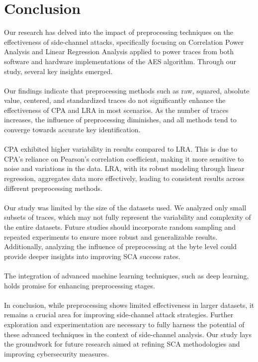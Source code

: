 \documentclass[a4paper,10pt]{article}
\begin{document}
\section{Conclusion}
Our research has delved into the impact of preprocessing techniques on the effectiveness of side-channel attacks, specifically focusing on Correlation Power Analysis and Linear Regression Analysis applied to power traces from both software and hardware implementations of the AES algorithm. Through our study, several key insights emerged. \\ \\
Our findings indicate that preprocessing methods such as raw, squared, absolute value, centered, and standardized traces do not significantly enhance the effectiveness of CPA and LRA in most scenarios. As the number of traces increases, the influence of preprocessing diminishes, and all methods tend to converge towards accurate key identification. \\ \\
CPA exhibited higher variability in results compared to LRA. This is due to CPA's reliance on Pearson's correlation coefficient, making it more sensitive to noise and variations in the data. LRA, with its robust modeling through linear regression, aggregates data more effectively, leading to consistent results across different preprocessing methods. \\ \\
Our study was limited by the size of the datasets used. We analyzed only small subsets of traces, which may not fully represent the variability and complexity of the entire datasets. Future studies should incorporate random sampling and repeated experiments to ensure more robust and generalizable results. Additionally, analyzing the influence of preprocessing at the byte level could provide deeper insights into improving SCA success rates. \\ \\
The integration of advanced machine learning techniques, such as deep learning, holds promise for enhancing preprocessing stages. \\ \\
In conclusion, while preprocessing shows limited effectiveness in larger datasets, it remains a crucial area for improving side-channel attack strategies. Further exploration and experimentation are necessary to fully harness the potential of these advanced techniques in the context of side-channel analysis. Our study lays the groundwork for future research aimed at refining SCA methodologies and improving cybersecurity measures.


\end{document}
